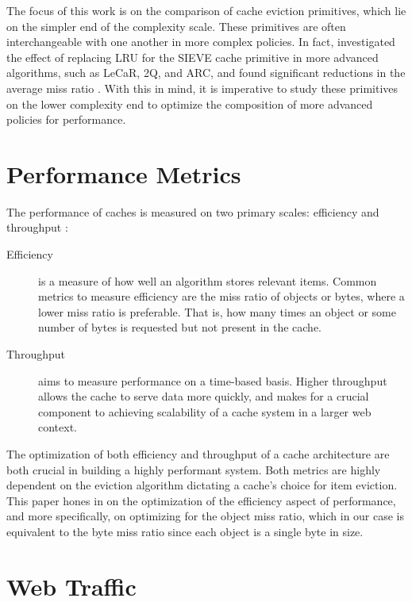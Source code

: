 The focus of this work is on the comparison of cache eviction primitives, which lie on the simpler end of the complexity scale. These primitives are often interchangeable with one another in more complex policies. In fact, \citeauthor{sieve} investigated the effect of replacing LRU for the SIEVE cache primitive in more advanced algorithms, such as LeCaR, 2Q, and ARC, and found significant reductions in the average miss ratio \cite{sieve}. With this in mind, it is imperative to study these primitives on the lower complexity end to optimize the composition of more advanced policies for performance.


\section{Performance Metrics}


The performance of caches is measured on two primary scales: efficiency and throughput \cite{sieve}:

\begin{description}
    \item[Efficiency] is a measure of how well an algorithm stores relevant items. Common metrics to measure efficiency are the miss ratio of objects or bytes, where a lower miss ratio is preferable. That is, how many times an object or some number of bytes is requested but not present in the cache.
    \item[Throughput] aims to measure performance on a time-based basis. Higher throughput allows the cache to serve data more quickly, and makes for a crucial component to achieving scalability of a cache system in a larger web context.
\end{description}

The optimization of both efficiency and throughput of a cache architecture are both crucial in building a highly performant system. Both metrics are highly dependent on the eviction algorithm dictating a cache's choice for item eviction. This paper hones in on the optimization of the efficiency aspect of performance, and more specifically, on optimizing for the object miss ratio, which in our case is equivalent to the byte miss ratio since each object is a single byte in size.

\section{Web Traffic}

